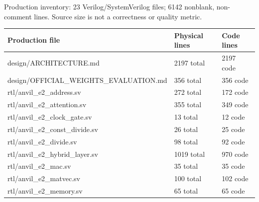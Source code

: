 \documentclass[11pt,a4paper]{article}
\begin{document}
Production inventory: 23 Verilog/\allowbreak{}SystemVerilog files; 6142 nonblank,\allowbreak{} non-comment lines. Source size is not a correctness or quality metric.

{\small\renewcommand{\arraystretch}{1.18}\begin{longtable}{@{}L{0.55\textwidth}|L{0.18\textwidth}|L{0.18\textwidth}@{}}\toprule

\textbf{Production file} & \textbf{Physical lines} & \textbf{Code lines}\\\midrule\endhead

design/\allowbreak{}ARCHITECTURE.md & 2197 total & 2197 code\\[2pt]\hline

design/\allowbreak{}OFFICIAL\_\allowbreak{}WEIGHTS\_\allowbreak{}EVALUATION.md & 356 total & 356 code\\[2pt]\hline

rtl/\allowbreak{}anvil\_\allowbreak{}e2\_\allowbreak{}address.sv & 272 total & 172 code\\[2pt]\hline

rtl/\allowbreak{}anvil\_\allowbreak{}e2\_\allowbreak{}attention.sv & 355 total & 349 code\\[2pt]\hline

rtl/\allowbreak{}anvil\_\allowbreak{}e2\_\allowbreak{}clock\_\allowbreak{}gate.sv & 13 total & 12 code\\[2pt]\hline

rtl/\allowbreak{}anvil\_\allowbreak{}e2\_\allowbreak{}const\_\allowbreak{}divide.sv & 26 total & 25 code\\[2pt]\hline

rtl/\allowbreak{}anvil\_\allowbreak{}e2\_\allowbreak{}divide.sv & 98 total & 92 code\\[2pt]\hline

rtl/\allowbreak{}anvil\_\allowbreak{}e2\_\allowbreak{}hybrid\_\allowbreak{}layer.sv & 1019 total & 970 code\\[2pt]\hline

rtl/\allowbreak{}anvil\_\allowbreak{}e2\_\allowbreak{}mac.sv & 35 total & 35 code\\[2pt]\hline

rtl/\allowbreak{}anvil\_\allowbreak{}e2\_\allowbreak{}matvec.sv & 100 total & 102 code\\[2pt]\hline

rtl/\allowbreak{}anvil\_\allowbreak{}e2\_\allowbreak{}memory.sv & 65 total & 65 code\\[2pt]\hline


\end{longtable}}
\end{document}
